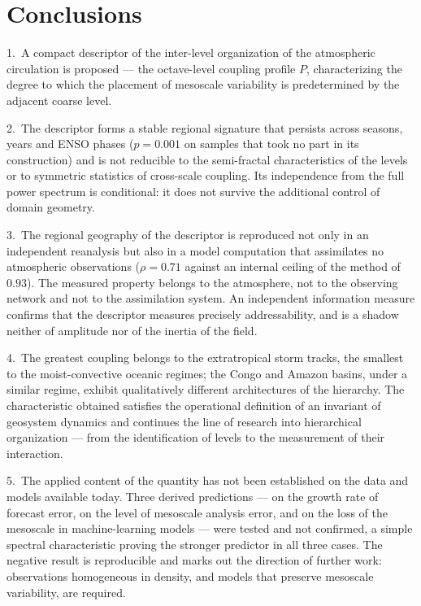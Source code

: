 \documentclass[11pt,a4paper]{article}
\begin{document}
\section{Conclusions}
\label{sec:conclusion}

1.~A compact descriptor of the inter-level organization of the atmospheric circulation is proposed --- the octave-level coupling profile $P$, characterizing the degree to which the placement of mesoscale variability is predetermined by the adjacent coarse level.

2.~The descriptor forms a stable regional signature that persists across seasons, years and ENSO phases ($p=0.001$ on samples that took no part in its construction) and is not reducible to the semi-fractal characteristics of the levels or to symmetric statistics of cross-scale coupling. Its independence from the full power spectrum is conditional: it does not survive the additional control of domain geometry.

3.~The regional geography of the descriptor is reproduced not only in an independent reanalysis but also in a model computation that assimilates no atmospheric observations ($\rho=0.71$ against an internal ceiling of the method of $0.93$). The measured property belongs to the atmosphere, not to the observing network and not to the assimilation system. An independent information measure confirms that the descriptor measures precisely addressability, and is a shadow neither of amplitude nor of the inertia of the field.

4.~The greatest coupling belongs to the extratropical storm tracks, the smallest to the moist-convective oceanic regimes; the Congo and Amazon basins, under a similar regime, exhibit qualitatively different architectures of the hierarchy. The characteristic obtained satisfies the operational definition of an invariant of geosystem dynamics and continues the line of research into hierarchical organization --- from the identification of levels to the measurement of their interaction.

5.~The applied content of the quantity has not been established on the data and models available today. Three derived predictions --- on the growth rate of forecast error, on the level of mesoscale analysis error, and on the loss of the mesoscale in machine-learning models --- were tested and not confirmed, a simple spectral characteristic proving the stronger predictor in all three cases. The negative result is reproducible and marks out the direction of further work: observations homogeneous in density, and models that preserve mesoscale variability, are required.
\end{document}
